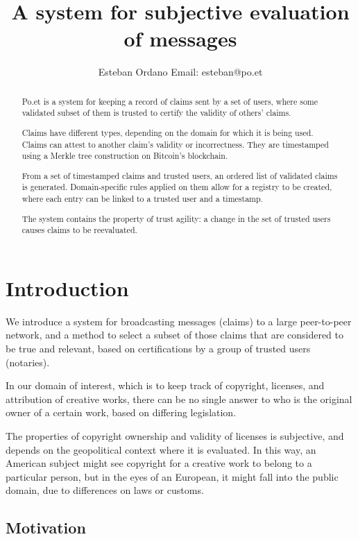 \documentclass[12pt]{article}
\begin{document}
\title{A system for subjective evaluation of messages}

\author{Esteban Ordano
  Email: esteban@po.et}

\begin{abstract}

  Po.et is a system for keeping a record of claims sent by a set of users,
  where some validated subset of them is trusted to certify the validity of others' claims.

  Claims have different types, depending on the domain for which it is being used.
  Claims can attest to another claim's validity or incorrectness.
  They are timestamped using a Merkle tree construction on Bitcoin's blockchain.

  From a set of timestamped claims and trusted users,
  an ordered list of validated claims is generated.
  Domain-specific rules applied on them allow for a registry to be created,
  where each entry can be linked to a trusted user and a timestamp.

  The system contains the property of trust agility: a change in the set of trusted
  users causes claims to be reevaluated.

\end{abstract}

\section{Introduction}

We introduce a system for broadcasting messages (claims) to a large peer-to-peer network,
and a method to select a subset of those claims that are considered to be true and relevant,
based on certifications by a group of trusted users (notaries).

In our domain of interest, which is to keep track of copyright, licenses, 
and attribution of creative works, there can be no single answer to who is the original
owner of a certain work, based on differing legislation.

The properties of copyright ownership and validity of licenses
is subjective, and depends on the geopolitical context where it is evaluated.
In this way, an American subject might see copyright for a creative work to belong to a particular person, but in the eyes of an European,
it might fall into the public domain, due to differences on laws or customs.

\subsection{Motivation}
\end{document}
